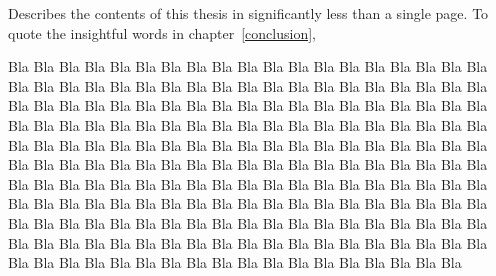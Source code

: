 %
%
%
%
%
%
%
%
%


Describes the contents of this thesis in significantly less than a single page.
To quote the insightful words in chapter~\ref{conclusion}, %

Bla Bla Bla Bla Bla Bla Bla Bla Bla Bla Bla Bla Bla Bla Bla Bla Bla Bla Bla Bla
Bla Bla Bla Bla Bla Bla Bla Bla Bla Bla Bla Bla Bla Bla Bla Bla Bla Bla Bla Bla
Bla Bla Bla Bla Bla Bla Bla Bla Bla Bla Bla Bla Bla Bla Bla Bla Bla Bla Bla Bla
Bla Bla Bla Bla Bla Bla Bla Bla Bla Bla Bla Bla Bla Bla Bla Bla Bla Bla Bla Bla
Bla Bla Bla Bla Bla Bla Bla Bla Bla Bla Bla Bla Bla Bla Bla Bla Bla Bla Bla Bla
Bla Bla Bla Bla Bla Bla Bla Bla Bla Bla Bla Bla Bla Bla Bla Bla Bla Bla Bla Bla
Bla Bla Bla Bla Bla Bla Bla Bla Bla Bla Bla Bla Bla Bla Bla Bla Bla Bla Bla Bla
Bla Bla Bla Bla Bla Bla Bla Bla Bla Bla Bla Bla Bla Bla Bla Bla Bla Bla Bla Bla
Bla Bla Bla Bla Bla Bla Bla Bla Bla Bla Bla Bla Bla Bla Bla Bla Bla Bla Bla Bla
Bla Bla Bla Bla Bla Bla Bla Bla Bla Bla Bla Bla Bla Bla Bla Bla Bla Bla Bla Bla
Bla Bla Bla Bla Bla Bla Bla Bla


